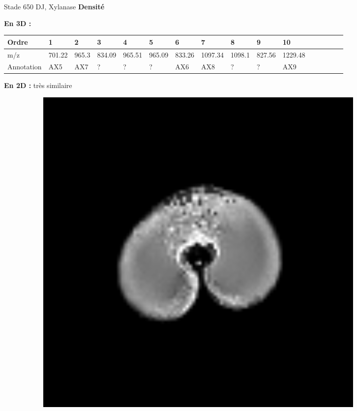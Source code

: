\documentclass[10pt]{beamer}
\begin{document}
\begin{frame}{Stade 650 DJ, Xylanase}
  \textbf{Densité}
  
  \textbf{En 3D :}
  \vspace{-0.4cm}
    \begin{table}[]
    \centering
    \begin{adjustbox}{max width=1\textwidth}
      \begin{tabular}{llllllllllllllll}
        \toprule
        Ordre & 1       & 2       & 3       & 4       & 5       & 6       & 7       & 8       & 9       & 10       \\
        \midrule
        m/z &     701.22 & 965.3 & 834.09 & 965.51 & 965.09 & 833.26 & 1097.34 & 1098.1 & 827.56 & 1229.48 \\
        Annotation &  AX5 & AX7 & ? & ? & ? & AX6 & AX8 & ?  & ? & AX9\\
        \bottomrule
      \end{tabular}
    \end{adjustbox}
  \end{table}


  \textbf{En 2D :} très similaire

  \begin{figure}[ht]
    \centering
    \begin{subfigure}[t]{0.33\textwidth}
      \centering
      \includegraphics[width=0.9\textwidth]{fig/stats_650Xyl_density_irm}


\end{subfigure}
\end{figure}
\end{frame}
\end{document}
